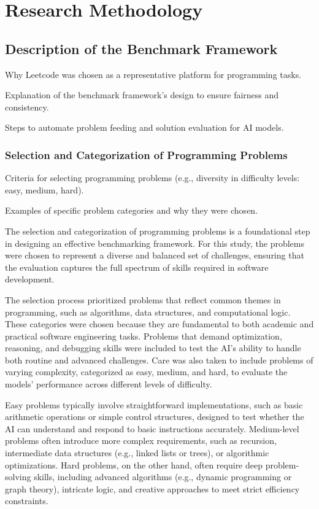 
\section{Research Methodology}

\subsection{Description of the Benchmark Framework}

Why Leetcode was chosen as a representative platform for programming tasks.

Explanation of the benchmark framework's design to ensure fairness and consistency.

Steps to automate problem feeding and solution evaluation for AI models.

\subsubsection{Selection and Categorization of Programming Problems}

Criteria for selecting programming problems (e.g., diversity in difficulty levels: easy, medium, hard).

Examples of specific problem categories and why they were chosen.



The selection and categorization of programming problems is a foundational step in designing an effective benchmarking framework. For this study, the problems were chosen to represent a diverse and balanced set of challenges, ensuring that the evaluation captures the full spectrum of skills required in software development.

The selection process prioritized problems that reflect common themes in programming, such as algorithms, data structures, and computational logic. These categories were chosen because they are fundamental to both academic and practical software engineering tasks. Problems that demand optimization, reasoning, and debugging skills were included to test the AI's ability to handle both routine and advanced challenges. Care was also taken to include problems of varying complexity, categorized as easy, medium, and hard, to evaluate the models’ performance across different levels of difficulty.

Easy problems typically involve straightforward implementations, such as basic arithmetic operations or simple control structures, designed to test whether the AI can understand and respond to basic instructions accurately. Medium-level problems often introduce more complex requirements, such as recursion, intermediate data structures (e.g., linked lists or trees), or algorithmic optimizations. Hard problems, on the other hand, often require deep problem-solving skills, including advanced algorithms (e.g., dynamic programming or graph theory), intricate logic, and creative approaches to meet strict efficiency constraints.

